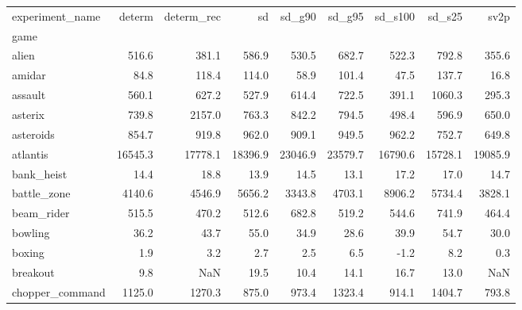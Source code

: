 \documentclass{article} %
\begin{document}
\begin{tabular}{lrrrrrrrr}\label{tab:all_results}

experiment\_name &  determ &  determ\_rec &  sd &  sd\_g90 &  sd\_g95 &  sd\_s100 &  sd\_s25 &  sv2p \\
game            &            &                 &          &              &              &               &              &            \\
\midrule
alien           &      516.6 &           381.1 &    586.9 &        530.5 &        682.7 &         522.3 &        792.8 &      355.6 \\
amidar          &       84.8 &           118.4 &    114.0 &         58.9 &        101.4 &          47.5 &        137.7 &       16.8 \\
assault         &      560.1 &           627.2 &    527.9 &        614.4 &        722.5 &         391.1 &       1060.3 &      295.3 \\
asterix         &      739.8 &          2157.0 &    763.3 &        842.2 &        794.5 &         498.4 &        596.9 &      650.0 \\
asteroids       &      854.7 &           919.8 &    962.0 &        909.1 &        949.5 &         962.2 &        752.7 &      649.8 \\
atlantis        &    16545.3 &         17778.1 &  18396.9 &      23046.9 &      23579.7 &       16790.6 &      15728.1 &    19085.9 \\
bank\_heist      &       14.4 &            18.8 &     13.9 &         14.5 &         13.1 &          17.2 &         17.0 &       14.7 \\
battle\_zone     &     4140.6 &          4546.9 &   5656.2 &       3343.8 &       4703.1 &        8906.2 &       5734.4 &     3828.1 \\
beam\_rider      &      515.5 &           470.2 &    512.6 &        682.8 &        519.2 &         544.6 &        741.9 &      464.4 \\
bowling         &       36.2 &            43.7 &     55.0 &         34.9 &         28.6 &          39.9 &         54.7 &       30.0 \\
boxing          &        1.9 &             3.2 &      2.7 &          2.5 &          6.5 &          -1.2 &          8.2 &        0.3 \\
breakout        &        9.8 &             NaN &     19.5 &         10.4 &         14.1 &          16.7 &         13.0 &        NaN \\
chopper\_command &     1125.0 &          1270.3 &    875.0 &        973.4 &       1323.4 &         914.1 &       1404.7 &      793.8 \\

\end{tabular}
\end{document}
